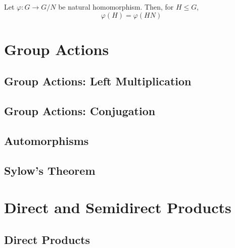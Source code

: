 \documentclass[12pt, a4paper, openany, twoside]{book}
\theoremstyle{definition}
\theoremstyle{remark}
\theoremstyle{plain}
\numberwithin{equation}{section}
\begin{document}
\begin{tcolorbox}[colback=yellow!10!white,colframe=gray!75!black,title=Remarks]

Let $\varphi: G \rightarrow G/N$ be natural homomorphism. Then, for $H \leq G$, 
\[\varphi(H) = \varphi(HN)\]

\end{tcolorbox}

\begin{tcolorbox}[colback=yellow!10!white,colframe=violet!75!white,title=Exercise Sec 3.3.]


    
\end{tcolorbox}

\newpage 

\section{}

\chapter{Group Actions}

\section{}

\section{Group Actions: Left Multiplication}

\section{Group Actions: Conjugation}

\section{Automorphisms}

\section{Sylow's Theorem}

\chapter{Direct and Semidirect Products}

\section{Direct Products}
\end{document}
